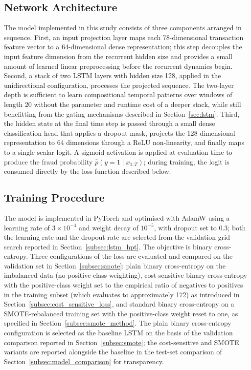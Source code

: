 \documentclass[oneside,12pt,parskip=half,american,numbers=noenddot]{scrreprt}
\begin{document}
\subsection{Network Architecture}
\label{subsec:lstm_arch}

The model implemented in this study consists of three components arranged in sequence. First, an input projection layer maps each 78-dimensional transaction feature vector to a 64-dimensional dense representation; this step decouples the input feature dimension from the recurrent hidden size and provides a small amount of learned linear preprocessing before the recurrent dynamics begin. Second, a stack of two LSTM layers with hidden size 128, applied in the unidirectional configuration, processes the projected sequence. The two-layer depth is sufficient to learn compositional temporal patterns over windows of length 20 without the parameter and runtime cost of a deeper stack, while still benefitting from the gating mechanisms described in Section~\ref{sec:lstm}. Third, the hidden state at the final time step is passed through a small dense classification head that applies a dropout mask, projects the 128-dimensional representation to 64 dimensions through a ReLU non-linearity, and finally maps to a single scalar logit. A sigmoid activation is applied at evaluation time to produce the fraud probability $\hat{p}(y = 1 \mid x_{1:T})$; during training, the logit is consumed directly by the loss function described below.

\subsection{Training Procedure}
\label{subsec:lstm_train}

The model is implemented in PyTorch and optimised with AdamW using a learning rate of $3\times 10^{-4}$ and weight decay of $10^{-5}$, with dropout set to $0.3$; both the learning rate and the dropout rate are selected from the validation grid search reported in Section~\ref{subsec:lstm_hpt}. The objective is binary cross-entropy. Three configurations of the loss are evaluated and compared on the validation set in Section~\ref{subsec:smote}: plain binary cross-entropy on the imbalanced data (no positive-class weighting), cost-sensitive binary cross-entropy with the positive-class weight set to the empirical ratio of negatives to positives in the training subset (which evaluates to approximately 172) as introduced in Section~\ref{subsec:cost_sensitive_loss}, and standard binary cross-entropy on a SMOTE-rebalanced training set with the positive-class weight reset to one, as specified in Section~\ref{subsec:smote_method}. The plain binary cross-entropy configuration is selected as the baseline LSTM on the basis of the validation comparison reported in Section~\ref{subsec:smote}; the cost-sensitive and SMOTE variants are reported alongside the baseline in the test-set comparison of Section~\ref{subsec:model_comparison} for transparency.
\end{document}
